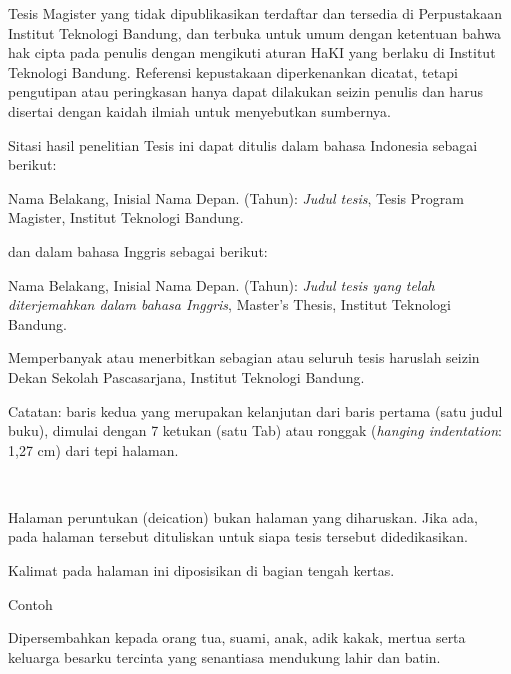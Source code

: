 \documentclass{itb-thesis}
\begin{document}
\cover
\approvalpage

\thesisguide
\begin{onehalfspace}
Tesis Magister yang tidak dipublikasikan terdaftar dan tersedia di Perpustakaan Institut Teknologi Bandung, dan terbuka untuk umum dengan ketentuan bahwa hak cipta pada penulis dengan mengikuti aturan HaKI yang berlaku di Institut Teknologi Bandung. Referensi kepustakaan diperkenankan dicatat, tetapi pengutipan atau peringkasan hanya dapat dilakukan seizin penulis dan harus disertai dengan kaidah ilmiah untuk menyebutkan sumbernya.

\vspace{14pt}

Sitasi hasil penelitian Tesis ini dapat ditulis dalam bahasa Indonesia sebagai berikut:

\begin{hangparas}{1.27cm}{1}
Nama Belakang, Inisial Nama Depan. (Tahun): \textit{Judul tesis}, Tesis Program Magister, Institut Teknologi Bandung.
\end{hangparas}

\vspace{14pt}

dan dalam bahasa Inggris sebagai berikut:

\vspace{14pt}

\begin{hangparas}{1.27cm}{1}
Nama Belakang, Inisial Nama Depan. (Tahun): \textit{Judul tesis yang telah diterjemahkan dalam bahasa Inggris}, Master's Thesis, Institut Teknologi Bandung.
\end{hangparas}

\vspace{14pt}

Memperbanyak atau menerbitkan sebagian atau seluruh tesis haruslah seizin Dekan Sekolah Pascasarjana, Institut Teknologi Bandung.

\vspace{14pt}

Catatan: baris kedua yang merupakan kelanjutan dari baris pertama (satu judul buku), dimulai dengan 7 ketukan (satu Tab) atau ronggak (\textit{hanging indentation}: 1,27 cm) dari tepi halaman.
\end{onehalfspace}

\dedicationpage
\begin{center}
\begin{onehalfspace}
\ 
\vfill
\begin{itshape}
Halaman peruntukan (deication) bukan halaman yang diharuskan. Jika ada, pada halaman tersebut dituliskan untuk siapa tesis tersebut didedikasikan.

Kalimat pada halaman ini diposisikan di bagian tengah kertas.

Contoh

Dipersembahkan kepada orang tua, suami, anak, adik kakak, mertua serta keluarga besarku tercinta yang senantiasa mendukung lahir dan batin.
\end{itshape}
\vfill
\end{onehalfspace}
\end{center}
\end{document}
